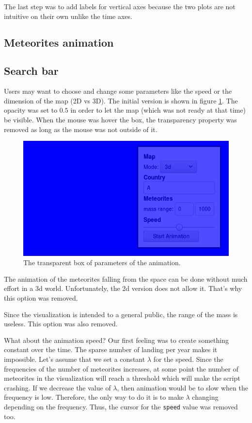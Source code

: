\documentclass[10pt,conference,compsocconf]{IEEEtran}
\begin{document}
The last step was to add labels for vertical axes because the two plots are not intuitive on their own unlike the time axes.

\subsection{Meteorites animation}


\subsection{Search bar}

Users may want to choose and change some parameters like the speed or the dimension of the map (2D vs 3D). The initial version is shown in figure \ref{fig:box_tool}. The opacity was set to $0.5$ in order to let the map (which was not ready at that time) be visible. When the mouse was hover the box, the transparency property was removed as long as the mouse was not outside of it.

\begin{figure}[H]
  \centering
  \includegraphics[width=\columnwidth]{images/animation_box_tool.png}
  \vspace{-3mm}
  \caption{The transparent box of parameters of the animation.}
  \label{fig:box_tool}
\end{figure}

The animation of the meteorites falling from the space can be done without much effort in a 3d world. Unfortunately, the 2d version does not allow it. That's why this option was removed.

Since the visualization is intended to a general public, the range of the mass is useless. This option was also removed.

What about the animation speed? Our first feeling was to create something constant over the time. The sparse number of landing per year makes it impossible. Let's assume that we set a constant $\lambda$ for the speed. Since the frequencies of the number of meteorites increases, at some point the number of meteorites in the visualization will reach a threshold which will make the script crashing. If we decrease the value of $\lambda$, then animation would be to slow when the frequency is low. Therefore, the only way to do it is to make $\lambda$ changing depending on the frequency. Thus, the cursor for the \texttt{speed} value was removed too.
\end{document}
